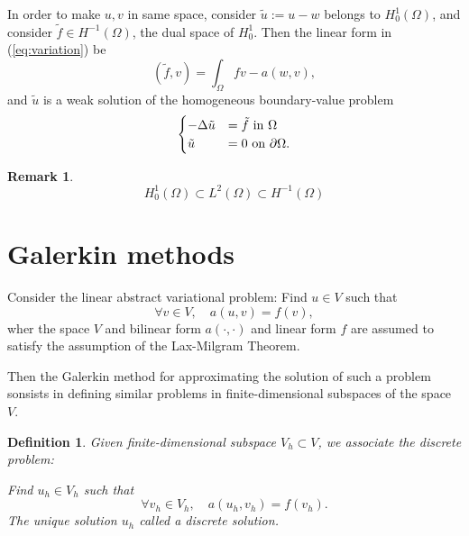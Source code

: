 \documentclass[11pt,letterpaper]{article}
\newtheorem{defn}[thm]{Definition}
\newtheorem{rem}{Remark}
\begin{document}
In order to make $u,v$ in same space,
consider $\tilde u:= u-w$ belongs to $H^1_0(\Omega)$,
and consider $\tilde f\in H^{-1}(\Omega)$, the dual space of $H_0^1$.
Then the linear form in (\ref{eq:variation}) be
\begin{displaymath}
  (\tilde f,v)=\int_\Omega fv - a(w,v),
\end{displaymath}
and $\tilde u$ is a weak solution of the homogeneous boundary-value problem
\begin{equation}\label{pro:non-dirichlet}
  \begin{cases}
    -\Delta\tilde u&= \tilde f\textmd{ in }\Omega\\
   \tilde u&=0\textmd{ on }\partial \Omega.
  \end{cases}
\end{equation}

\begin{rem}
  \begin{displaymath}
    H^1_0(\Omega)\subset L^2(\Omega)\subset H^{-1}(\Omega)
  \end{displaymath}
\end{rem}



\section{Galerkin methods }
\label{sec:galerkin}

Consider the linear abstract variational problem:
Find $u\in V$ such that
\begin{displaymath}
  \forall v\in V, \quad a(u,v)=f(v),
\end{displaymath}
wher the space $V$ and bilinear form $a(\cdot, \cdot)$ and linear form $f$
are assumed to satisfy the assumption of the Lax-Milgram Theorem.

Then the Galerkin method for approximating the solution of such a problem
sonsists in defining similar problems in finite-dimensional subspaces of the space $V$.
\begin{defn}
  Given finite-dimensional subspace $V_h\subset V$,
  we associate the discrete problem:
  
  Find $u_h\in V_h$ such that
  \begin{displaymath}
    \forall v_h\in V_h, \quad a(u_h,v_h)=f(v_h).
  \end{displaymath}
  The unique solution $u_h$ called a \emph{discrete solution}.
\end{defn}
\end{document}
